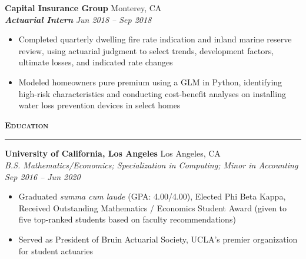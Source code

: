 \documentclass[11pt,letterpaper]{article}
\newcommand{\sectline}{\vspace{5pt}\hrule height 1.5pt\vspace{5pt}}
\newcommand{\sectspace}{\vspace{9pt}}
\newcommand{\smallspace}{\vspace{6pt}}
\newcommand{\heading}[1]{{\fontsize{12pt}{13pt} {\textbf{\textsc{#1}}}}}
\begin{document}
\smallspace 
\textbf{Capital Insurance Group} \hfill Monterey, CA \\
\textbf{\textit{Actuarial Intern}} \hfill \textit{Jun 2018 -- Sep 2018}
\begin{itemize}
	\item Completed quarterly dwelling fire rate indication and inland marine reserve review, using actuarial judgment to select trends, development factors, ultimate losses, and indicated rate changes
	\item Modeled homeowners pure premium using a GLM in Python, identifying high-risk characteristics and conducting cost-benefit analyses on installing water loss prevention devices in select homes
\end{itemize}
\sectspace

\heading{Education}\sectline
\textbf{University of California, Los Angeles} \hfill Los Angeles, CA \\
\textit{B.S. Mathematics/Economics; Specialization in Computing; Minor in Accounting} \hfill \textit{Sep 2016 -- Jun 2020}
\begin{itemize}
	\item Graduated \textit{summa cum laude} (GPA: 4.00/4.00), Elected Phi Beta Kappa, Received Outstanding Mathematics / Economics Student Award (given to five  top-ranked students based on faculty recommendations)
	\item Served as President of Bruin Actuarial Society, UCLA's premier organization for student actuaries 
\end{itemize}
\sectspace
\end{document}
